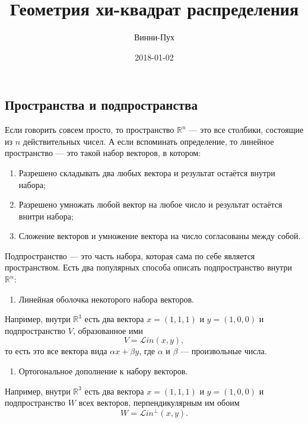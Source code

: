 \documentclass[11pt,russian,]{article}
\title{Геометрия хи-квадрат распределения}
\author{Винни-Пух}
\date{2018-01-02}
\providecommand{\tightlist}{%
  \setlength{\itemsep}{0pt}\setlength{\parskip}{0pt}}
\newcommand{\RR}{\mathbb{R}}
\renewcommand{\Rn}{\RR^n}
\newcommand{\1}{\mathbbm{1}}
\newcommand{\Lin}{\mathcal{L}in}
\newcommand{\Linp}{\Lin^{\perp}}
\begin{document}
\maketitle

{
\setcounter{tocdepth}{2}
\tableofcontents
}
\subsection{Пространства и подпространства}\label{--}

Если говорить совсем просто, то пространство \(\Rn\) --- это все
столбики, состоящие из \(n\) действительных чисел. А если вспоминать
определение, то линейное пространство --- это такой набор векторов, в
котором:

\begin{enumerate}
\def\labelenumi{\arabic{enumi}.}
\tightlist
\item
  Разрешено складывать два любых вектора и результат остаётся внутри
  набора;
\item
  Разрешено умножать любой вектор на любое число и результат остаётся
  внитри набора;
\item
  Сложение векторов и умножение вектора на число согласованы между
  собой.
\end{enumerate}

Подпространство --- это часть набора, которая сама по себе является
пространством. Есть два популярных способа описать подпространство
внутри \(\Rn\):

\begin{enumerate}
\def\labelenumi{\arabic{enumi}.}
\tightlist
\item
  Линейная оболочка некоторого набора векторов.
\end{enumerate}

Например, внутри \(\RR^{3}\) есть два вектора \(x = (1, 1, 1)\) и
\(y = (1, 0, 0)\) и подпространство \(V\), образованное ими \[
V = \Lin (x, y),
\] то есть это все вектора вида \(\alpha x + \beta y\), где \(\alpha\) и
\(\beta\) --- произвольные числа.

\begin{enumerate}
\def\labelenumi{\arabic{enumi}.}
\setcounter{enumi}{1}
\tightlist
\item
  Ортогональное дополнение к набору векторов.
\end{enumerate}

Например, внутри \(\RR^{3}\) есть два вектора \(x = (1, 1, 1)\) и
\(y = (1, 0, 0)\) и подпространство \(W\) всех векторов,
перпендикулярным им обоим \[
W = \Linp (x, y).
\]
\end{document}
